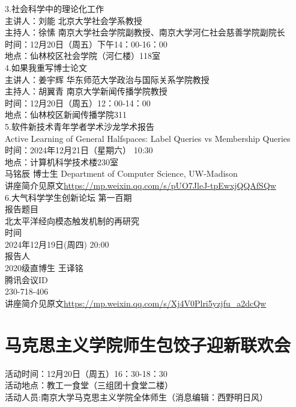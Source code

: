 \documentclass[letterpaper, 12pt]{article}
\begin{document}
\begin{multicols}{2}
3.社会科学中的理论化工作\\
主讲人：刘能 北京大学社会学系教授\\
主持人：徐愫 南京大学社会学院副教授、南京大学河仁社会慈善学院副院长\\
时间：12月20日（周五）下午14：00-16：00\\
地点：仙林校区社会学院（河仁楼）118室\\

4.如果我重写博士论文\\
主讲人：姜宇辉 华东师范大学政治与国际关系学院教授\\
主持人：胡翼青 南京大学新闻传播学院教授\\
时间：12月20日（周五）12：00-14：00\\
地点：仙林校区新闻传播学院311\\

5.软件新技术青年学者学术沙龙学术报告\\
Active Learning of General Halfspaces: Label Queries vs Membership Queries\\
时间：2024年12月21日（星期六） 10:30\\
地点：计算机科学技术楼230室\\
马铭辰 博士生 Department of Computer Science, UW-Madison\\
讲座简介见原文\url{https://mp.weixin.qq.com/s/pUO7JleJ-tpEwxjQQAfSQw}\\

6.大气科学学生创新论坛 第一百期\\
报告题目\\
北太平洋经向模态触发机制的再研究\\
时间\\
2024年12月19日(周四) 20:00\\
报告人\\
2020级直博生 王译铭\\
腾讯会议ID\\
230-718-406\\
讲座简介见原文\url{https://mp.weixin.qq.com/s/Xj4V0Plri5yzjfu_a2dcQw}\\

\section{马克思主义学院师生包饺子迎新联欢会}
活动时间：12月20日（周五）16：30-18：30\\
活动地点：教工一食堂（三组团十食堂二楼）\\
活动人员:南京大学马克思主义学院全体师生（消息编辑：西野明日风）\\      


\end{multicols}
\end{document}
